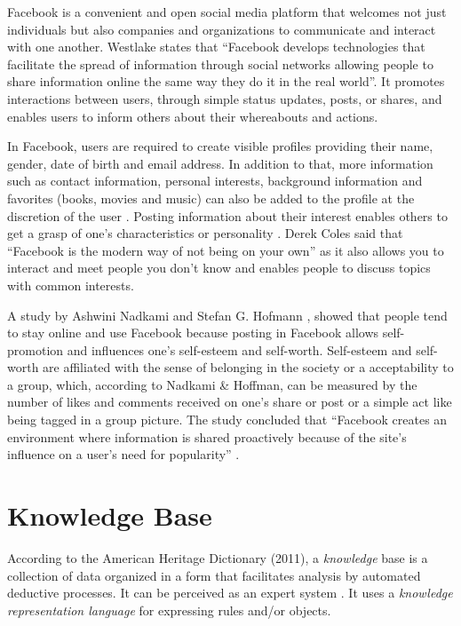 Facebook is a convenient and open social media platform that welcomes not just individuals but also companies and organizations to communicate and interact with one another. Westlake \citeyear{Westlake2008} states that ``Facebook develops technologies that facilitate the spread of information through social networks allowing people to share information online the same way they do it in the real world''. It promotes interactions between users, through simple status updates, posts, or shares, and enables users to inform others about their whereabouts and actions.

In Facebook, users are required to create visible profiles providing their name, gender, date of birth and email address. In addition to that, more information such as contact information, personal interests, background information and favorites (books, movies and music) can also be added to the profile at the discretion of the user \cite{NadkarniHofmann2012}. Posting information about their interest enables others to get a grasp of one's characteristics or personality \cite{FarahbakhshHanCuevasCrespi2013}. Derek Coles \citeyear{Doughty2015} said that ``Facebook is the modern way of not being on your own'' as it also allows you to interact and meet people you don't know and enables people to discuss topics with common interests. 

A study by Ashwini Nadkami and Stefan G. Hofmann \citeyear{NadkarniHofmann2012}, showed that people tend to stay online and use Facebook because posting in Facebook allows self-promotion and influences one's self-esteem and self-worth. Self-esteem and self-worth are affiliated with the sense of belonging in the society or a acceptability to a group, which, according to Nadkami \& Hoffman, can be measured by the number of likes and comments received on one's share or post or a simple act like being tagged in a group picture. The study concluded that ``Facebook creates an environment where information is shared proactively because of the site's influence on a  user's need for popularity'' \cite{NadkarniHofmann2012}.

\section{Knowledge Base}
According to the American Heritage Dictionary (2011), a \textit{knowledge} base is a collection of data organized in a form that facilitates analysis by automated deductive processes. It can be perceived as an expert system \cite{mars1995towards}. It uses a \textit{knowledge representation language} for expressing rules and/or objects.

